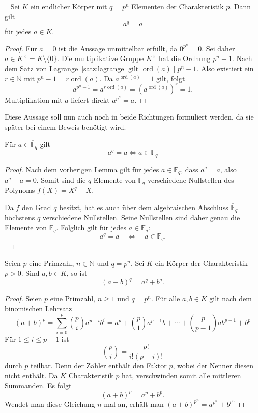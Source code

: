\begin{lemma}~\label{lem:a^q=a}
    Sei $K$ ein endlicher Körper mit $q=p^n$ Elementen der Charakteristik $p$. Dann gilt
    \[
        a^q=a
    \] für jedes $a\in K$.
\end{lemma}

\begin{proof}
    Für \(a=0\) ist die Aussage unmittelbar erfüllt, da $0^{p^n}=0$. Sei daher \(a\in K^\times =K\setminus\{0\}\).
    Die multiplikative Gruppe $K^\times$
    hat die Ordnung $p^n-1$. Nach dem Satz von
    Lagrange~\ref{satz:lagrange} gilt \(\operatorname{ord}(a)\mid p^n-1\). Also existiert ein $r\in\mathbb{N}$ mit
    \(p^n-1=r \operatorname{ord}(a)\). Da \(a^{\operatorname{ord}(a)} = 1\) gilt, folgt
    \[
        a^{p^n-1}=a^{r\operatorname{ord}(a)}={\left(a^{\operatorname{ord}(a)}\right)}^r=1.
    \]
    Multiplikation mit $a$ liefert direkt \(a^{p^n}=a\).
\end{proof}
Diese Aussage soll nun auch noch in beide Richtungen formuliert werden, da sie später bei einem Beweis benötigt wird.
\begin{lemma}
    Für \(a\in \overline{\mathbb{F}}_q\) gilt
    \[
        a^q=a\Leftrightarrow a\in\mathbb{F}_q
    \]
\end{lemma}
\begin{proof}
    Nach dem vorherigen Lemma gilt für jedes
    \(a\in\mathbb F_q\), dass \(a^q=a\), also
    \(a^q-a=0\). Somit sind die \(q\) Elemente von
    \(\mathbb F_q\) verschiedene Nullstellen des
    Polynoms \(f(X)=X^q-X\).

    Da \(f\) den Grad \(q\) besitzt, hat es auch über
    dem algebraischen Abschluss \(\overline{\mathbb F}_q\)
    höchstens \(q\) verschiedene Nullstellen. Seine
    Nullstellen sind daher genau die Elemente von
    \(\mathbb F_q\). Folglich gilt für jedes
    \(a\in\overline{\mathbb F}_q\):
    \[
        a^q=a \quad\Longleftrightarrow\quad a\in\mathbb F_q.
    \]
\end{proof}
\begin{lemma}\label{lem:freshmans-dream}
    Seien $p$ eine Primzahl, $n\in\mathbb{N}$ und $q=p^n$. Sei $K$ ein Körper der Charakteristik $p>0$. Sind $a,b\in K$, so  ist
    \[
        {(a+b)}^q=a^q+b^q.
    \]
\end{lemma}
\begin{proof}
    Seien $p$ eine Primzahl, $n\geq 1$ und $q=p^n$. Für alle $a,b\in K$ gilt nach dem binomischen Lehrsatz
    \[
        {(a+b)}^p=\sum_{i=0}^p\binom{p}{i}a^{p-i}b^i= a^p+\binom{p}{1}a^{p-1}b+\cdots+\binom{p}{p-1}ab^{p-1}+b^p
    \]
    Für $1\leq i\leq p-1$ ist
    \[
        \binom pi=\frac{p!}{i!(p-i)!}
    \]
    durch $p$ teilbar. Denn der Zähler enthält den Faktor $p$, wobei der Nenner diesen nicht enthält. Da $K$ Charakteristik $p$ hat,
    verschwinden somit alle mittleren Summanden. Es folgt
    \[
        {(a+b)}^p=a^p+b^p.
    \]
    Wendet man diese Gleichung $n$-mal an, erhält man
    ${(a+b)}^{p^n}=a^{p^n}+b^{p^n}$
\end{proof}

